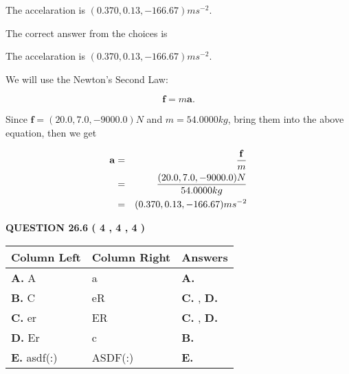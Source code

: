 \documentclass[12pt]{article}
\begin{document}
 
The accelaration is $  %
(
0.370,
0.13,
-166.67)
ms^{-2} $.
 
 
 
 
 
 
\noindent{}

The correct answer from the choices is


The accelaration is $  %
(
0.370,
0.13,
-166.67)
ms^{-2} $.
 
 
 
 
 
\noindent{}

We will use the Newton's Second Law:
 
\[
\mathbf{f}=m\mathbf{a}.
\]
 
Since $\mathbf{f}= %
(20.0 , 7.0 , -9000.0) N$
and $m= %
54.0000kg$, bring them into the above equation, then we get
 
\begin{eqnarray*}
\mathbf{a}&=&\frac{\mathbf{f}}m  \\
&=&\frac{ %
(20.0 , 7.0 , -9000.0) N}{ %
54.0000kg}  \\
&=& %
(0.370 , 0.13 , -166.67) ms^{-2}
\end{eqnarray*}
 
 
 
  
\vspace{0.2in}
  
{\textbf{\Large{QUESTION
26.6 
 (           4 ,           4 ,           4 )
}}}
  
  
 
 
\noindent{}
  
  
\begin{tabular}{|l|l|l|}
 \hline
 Column Left & Column Right  & Answers       \\ 
 \hline
{\textbf{\large{
A.}}}
A
  & 
a
 & 
{\textbf{\large{
A.}}}
 \\ 
 \hline
{\textbf{\large{
B.}}}
C
  & 
eR
 & 
{\textbf{\large{
C.}}}
, 
{\textbf{\large{
D.}}}
 \\ 
 \hline
{\textbf{\large{
C.}}}
er
  & 
ER
 & 
{\textbf{\large{
C.}}}
, 
{\textbf{\large{
D.}}}
 \\ 
 \hline
{\textbf{\large{
D.}}}
Er
  & 
c
 & 
{\textbf{\large{
B.}}}
 \\ 
 \hline
{\textbf{\large{
E.}}}
asdf(:)
  & 
ASDF(:)
 & 
{\textbf{\large{
E.}}}
 \\ 
 \hline
 \end{tabular}
  
\end{document}
